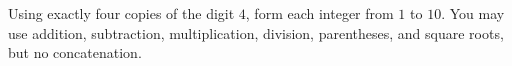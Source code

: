 Using exactly four copies of the digit $4$, form each integer from $1$ to $10$. You may use addition, subtraction, multiplication, division, parentheses, and square roots, but no concatenation.
